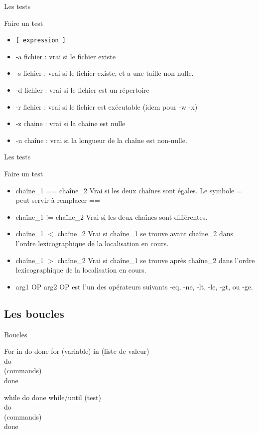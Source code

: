 \begin{frame}{Les tests}
\begin{block}{Faire un test}
\begin{itemize}
\item \verb![ expression ]!
\item -a fichier : vrai si le fichier existe
\item -s fichier : vrai si le fichier existe, et a une taille non nulle.
\item -d fichier : vrai si le fichier est un répertoire
\item -r fichier : vrai si le fichier est exécutable (idem pour -w -x)
\item -z chaine : vrai si la chaine est nulle
\item -n chaîne : vrai si la longueur de la chaîne est non-nulle. 
\end{itemize}
\end{block}
\end{frame}

\begin{frame}{Les tests}
\begin{block}{Faire un test}
\begin{itemize}
\item chaîne\_1 == chaîne\_2
    Vrai si les deux chaînes sont égales. Le symbole = peut servir à remplacer == 
\item chaîne\_1 != chaîne\_2
    Vrai si les deux chaînes sont différentes. 
\item chaîne\_1 $<$ chaîne\_2
    Vrai si chaîne\_1 se trouve avant chaîne\_2 dans l'ordre lexicographique de la localisation en cours. 
\item chaîne\_1 $>$ chaîne\_2
    Vrai si chaîne\_1 se trouve après chaîne\_2 dans l'ordre lexicographique de la localisation en cours. 
\item arg1 OP arg2
    OP est l'un des opérateurs suivants -eq, -ne, -lt, -le, -gt, ou -ge.
\end{itemize}
\end{block}
\end{frame}

\subsection{Les boucles}
\begin{frame}{Boucles}
\begin{block}{For in do done}
for (variable) in (liste de valeur)\\
do\\
(commands)\\
done
\end{block}


\begin{block}{while do done}
while/until (test)\\
do\\
(commands)\\
done
\end{block}
\end{frame}

